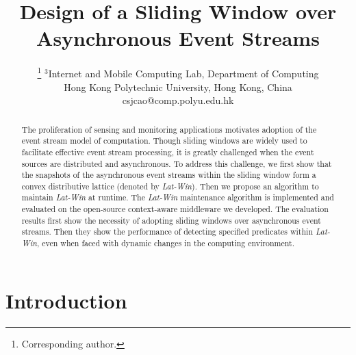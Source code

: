 \documentclass[12pt,journal,letterpaper,compsoc]{IEEEtran}
\begin{document}
\title{Design of a Sliding Window over Asynchronous Event Streams}

\author{
\thanks{Corresponding author.}
$^3$Internet and Mobile Computing Lab, Department of Computing\\
Hong Kong Polytechnic University, Hong Kong, China\\
csjcao@comp.polyu.edu.hk
}

\maketitle

\begin{abstract}

The proliferation of sensing and monitoring applications motivates adoption of the event stream model of computation. Though sliding windows are widely used to facilitate effective event stream processing, it is greatly challenged when the event sources are distributed and asynchronous. To address this challenge, we first show that the snapshots of the asynchronous event streams within the sliding window form a convex distributive lattice (denoted by {\it Lat-Win}). Then we propose an algorithm to maintain {\it Lat-Win} at runtime. The {\it Lat-Win} maintenance algorithm is implemented and evaluated on the open-source context-aware middleware we developed. The evaluation results first show the necessity of adopting sliding windows over asynchronous event streams. Then they show the performance of detecting specified predicates within {\it Lat-Win}, even when faced with dynamic changes in the computing environment.

\end{abstract}

\IEEEpeerreviewmaketitle

\section{Introduction}
\label{sec:introduction}
\end{document}
